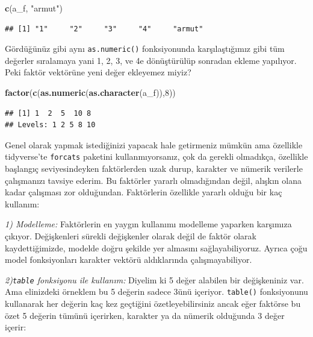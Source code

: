 \documentclass[
]{book}
\newenvironment{Shaded}{\begin{snugshade}}{\end{snugshade}}
\newcommand{\DecValTok}[1]{\textcolor[rgb]{0.00,0.00,0.81}{#1}}
\newcommand{\KeywordTok}[1]{\textcolor[rgb]{0.13,0.29,0.53}{\textbf{#1}}}
\newcommand{\NormalTok}[1]{#1}
\newcommand{\StringTok}[1]{\textcolor[rgb]{0.31,0.60,0.02}{#1}}
\begin{document}
\begin{Shaded}
\begin{Highlighting}[]
\KeywordTok{c}\NormalTok{(a\_f, }\StringTok{"armut"}\NormalTok{)}
\end{Highlighting}
\end{Shaded}

\begin{verbatim}
## [1] "1"     "2"     "3"     "4"     "armut"
\end{verbatim}

Gördüğünüz gibi aynı \texttt{as.numeric()} fonksiyonunda karşılaştığımız gibi tüm değerler sıralamaya yani 1, 2, 3, ve 4e dönüştürülüp sonradan ekleme yapılıyor. Peki faktör vektörüne yeni değer ekleyemez miyiz?

\begin{Shaded}
\begin{Highlighting}[]
\KeywordTok{factor}\NormalTok{(}\KeywordTok{c}\NormalTok{(}\KeywordTok{as.numeric}\NormalTok{(}\KeywordTok{as.character}\NormalTok{(a\_f)),}\DecValTok{8}\NormalTok{))}
\end{Highlighting}
\end{Shaded}

\begin{verbatim}
## [1] 1  2  5  10 8 
## Levels: 1 2 5 8 10
\end{verbatim}

Genel olarak yapmak istediğinizi yapacak hale getirmeniz mümkün ama özellikle tidyverse'te \texttt{forcats} paketini kullanmıyorsanız, çok da gerekli olmadıkça, özellikle başlangıç seviyesindeyken faktörlerden uzak durup, karakter ve nümerik verilerle çalışmanızı tavsiye ederim. Bu faktörler yararlı olmadığından değil, alışkın olana kadar çalışması zor olduğundan. Faktörlerin özellikle yararlı olduğu bir kaç kullanım:

\emph{1) Modelleme:} Faktörlerin en yaygın kullanımı modelleme yaparken karşımıza çıkıyor. Değişkenleri sürekli değişkenler olarak değil de faktör olarak kaydettiğimizde, modelde doğru şekilde yer almasını sağlayabiliyoruz. Ayrıca çoğu model fonksiyonları karakter vektörü aldıklarında çalışmayabiliyor.

\emph{2)\texttt{table} fonksiyonu ile kullanım:} Diyelim ki 5 değer alabilen bir değişkeniniz var. Ama elinizdeki örneklem bu 5 değerin sadece 3ünü içeriyor. \texttt{table()} fonksiyonunu kullanarak her değerin kaç kez geçtiğini özetleyebilirsiniz ancak eğer faktörse bu özet 5 değerin tümünü içerirken, karakter ya da nümerik olduğunda 3 değer içerir:
\end{document}
